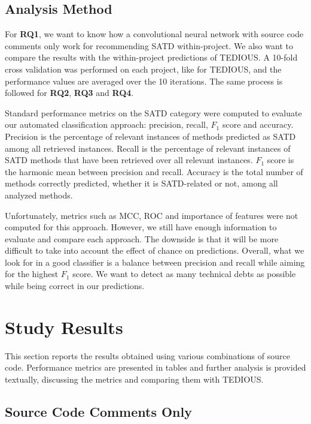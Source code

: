 \subsection{Analysis Method}


For \textbf{RQ1}, we want to know how a convolutional neural network with source code comments only work for recommending SATD within-project. We also want to compare the results with the within-project predictions of TEDIOUS. A 10-fold cross validation was performed on each project, like for TEDIOUS, and the performance values are averaged over the 10 iterations. The same process is followed for \textbf{RQ2}, \textbf{RQ3} and \textbf{RQ4}.

Standard performance metrics on the SATD category were computed to evaluate our automated classification approach: precision, recall, $F_1$ score and accuracy. Precision is the percentage of relevant instances of methods predicted as SATD among all retrieved instances. Recall is the percentage of relevant instances of SATD methods that have been retrieved over all relevant instances. $F_1$ score is the harmonic mean between precision and recall. Accuracy is the total number of methods correctly predicted, whether it is SATD-related or not, among all analyzed methods. 

Unfortunately, metrics such as MCC, ROC and importance of features were not computed for this approach. However, we still have enough information to evaluate and compare each approach. The downside is that it will be more difficult to take into account the effect of chance on predictions. Overall, what we look for in a good classifier is a balance between precision and recall while aiming for the highest $F_1$ score. We want to detect as many technical debts as possible while being correct in our predictions.

\section{Study Results}

This section reports the results obtained using various combinations of source code. Performance metrics are presented in tables and further analysis is provided textually, discussing the metrics and comparing them with TEDIOUS.

\subsection{Source Code Comments Only}

